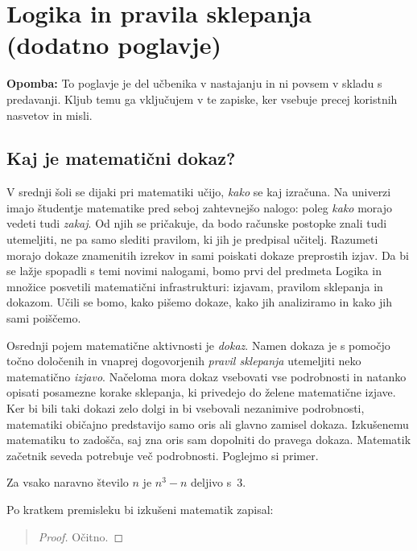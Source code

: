 \chapter{Logika in pravila sklepanja (dodatno poglavje)}
\label{chap:logika}


\textbf{Opomba:} To poglavje je del učbenika v nastajanju in ni povsem v skladu s predavanji. Kljub temu ga vključujem v te zapiske, ker vsebuje precej koristnih nasvetov in misli.

\section{Kaj je matematični dokaz?}
\label{sec:kaj-je-dokaz}

V srednji šoli se dijaki pri matematiki učijo, \emph{kako} se kaj
izračuna. Na univerzi imajo študentje matematike pred seboj
zahtevnejšo nalogo: poleg \emph{kako} morajo vedeti tudi \emph{zakaj}.
Od njih se pričakuje, da bodo računske postopke znali tudi utemeljiti,
ne pa samo slediti pravilom, ki jih je predpisal učitelj. Razumeti
morajo dokaze znamenitih izrekov in sami poiskati dokaze preprostih
izjav. Da bi se lažje spopadli s temi novimi nalogami, bomo prvi del
predmeta Logika in množice posvetili matematični infrastrukturi:
izjavam, pra\-vi\-lom sklepanja in dokazom. Učili se bomo, kako pišemo
dokaze, kako jih analiziramo in kako jih sami poiščemo.

Osrednji pojem matematične aktivnosti je \emph{dokaz}. Namen dokaza je
s pomočjo točno določenih in vnaprej dogovorjenih \emph{pravil
  sklepanja} utemeljiti neko matematično \emph{izjavo}. Načeloma mora
dokaz vsebovati vse podrobnosti in natanko opisati posamezne korake
sklepanja, ki privedejo do želene matematične izjave. Ker bi bili taki
dokazi zelo dolgi in bi vsebovali nezanimive podrobnosti, matematiki
običajno predstavijo samo oris ali glavno zamisel dokaza. Izkušenemu
matematiku to zadošča, saj zna oris sam dopolniti do pravega dokaza.
Matematik začetnik seveda potrebuje več podrobnosti. Poglejmo si
primer.

\begin{izrek}
  \label{izr:n3-n-deljivo-3}
  Za vsako naravno število $n$ je $n^3 - n$ deljivo s~$3$.
\end{izrek}

\noindent
Po kratkem premisleku bi izkušeni matematik zapisal:

\begin{quote}
  \begin{proof}
    Očitno.
  \end{proof}
\end{quote}

